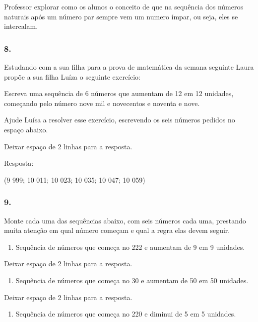 Professor explorar como os alunos o conceito de que na sequência dos
números naturais após um número par sempre vem um numero ímpar, ou seja,
eles se intercalam.

\subsubsection{8.}\label{section-33}

Estudando com a sua filha para a prova de matemática da semana seguinte
Laura propõe a sua filha Luíza o seguinte exercício:

Escreva uma sequência de 6 números que aumentam de 12 em 12 unidades,
começando pelo número nove mil e novecentos e noventa e nove.

Ajude Luísa a resolver esse exercício, escrevendo os seis números
pedidos no espaço abaixo.

Deixar espaço de 2 linhas para a resposta.

Resposta:

(9 999; 10 011; 10 023; 10 035; 10 047; 10 059)

\subsubsection{9.}\label{section-34}

Monte cada uma das sequências abaixo, com seis números cada uma,
prestando muita atenção em qual número começam e qual a regra elas devem
seguir.

\begin{enumerate}
\def\labelenumi{\alph{enumi})}
\item
  Sequência de números que começa no 222 e aumentam de 9 em 9 unidades.
\end{enumerate}

Deixar espaço de 2 linhas para a resposta.

\begin{enumerate}
\def\labelenumi{\alph{enumi})}
\item
  Sequência de números que começa no 30 e aumentam de 50 em 50 unidades.
\end{enumerate}

Deixar espaço de 2 linhas para a resposta.

\begin{enumerate}
\def\labelenumi{\alph{enumi})}
\item
  Sequência de números que começa no 220 e diminui de 5 em 5 unidades.
\end{enumerate}

